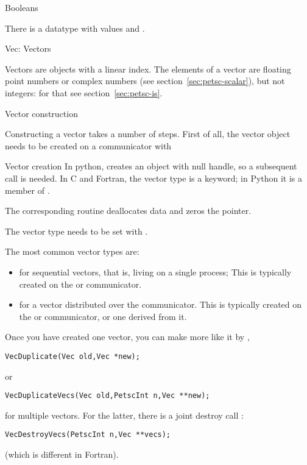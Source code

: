  {Booleans}

There is a  datatype
with values  and .

 {Vec: Vectors}

Vectors are objects with a linear index. The elements of a vector are
floating point numbers or complex numbers (see
section~\ref{sec:petsc-scalar}), but not integers: for that see
section~\ref{sec:petsc-is}.

 {Vector construction}

Constructing a vector takes a number of steps. First of all, the
vector object needs
to be created on a communicator with
%

\begin{pythonnote}{Vector creation}
  In python,  creates an object with null handle, so a
  subsequent  call is needed.
  In C and Fortran, the vector type is a keyword; in Python it is a
  member of .
\end{pythonnote}

The corresponding routine  deallocates data and zeros
the pointer.

The vector type needs to be set with .

The most common vector types are:
\begin{itemize}
\item {} for sequential vectors, that is, living on a single process;
  This is typically created on the  or
   communicator.
\item {} for a vector distributed over the communicator.
  This is typically created on the  or
   communicator, or one derived from it.
\end{itemize}

Once you have created one vector, you can make more like it by
,
\begin{lstlisting}
VecDuplicate(Vec old,Vec *new);
\end{lstlisting}
or 
\begin{lstlisting}
VecDuplicateVecs(Vec old,PetscInt n,Vec **new);
\end{lstlisting}
for multiple vectors.
For the latter, there is a joint destroy call
:
\begin{lstlisting}
VecDestroyVecs(PetscInt n,Vec **vecs);
\end{lstlisting}
(which is different in Fortran).

